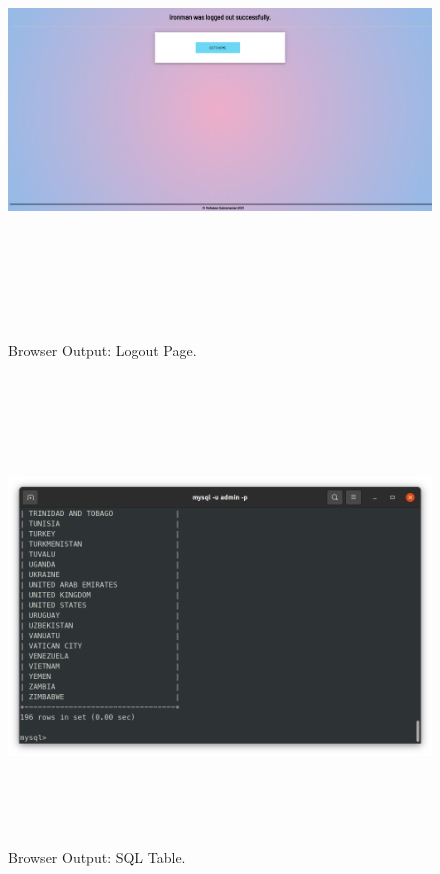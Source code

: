\documentclass[12pt, a4]{article}
\begin{document}
\newpage
\subsection*{}
\begin{figure}[h]
\centering
\caption{Browser Output: Logout Page.}
\includegraphics[height=12cm, width=18cm]{Output/Logout.png}
\end{figure}

\newpage
\subsection*{}
\begin{figure}[h]
\centering
\caption{Browser Output: SQL Table.}
\includegraphics[height=12cm, width=18cm]{Output/SQLTable.png}
\end{figure}
\end{document}
